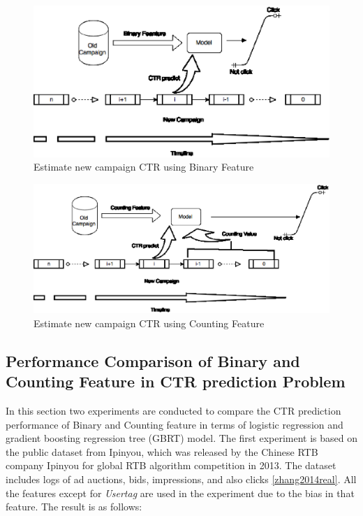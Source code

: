 \documentclass{sig-alternate}
\begin{document}
\begin{figure}[t]
\centering
\includegraphics[width=\columnwidth]{binaryrepresent.eps}
\caption{Estimate new campaign CTR using Binary Feature}
\label{fig:binary}
\end{figure}

\begin{figure}[h]
\centering
\includegraphics[width=\columnwidth]{counting.eps}
\caption{Estimate new campaign CTR using Counting Feature}
\label{fig:counting}
\end{figure}


\subsection{Performance Comparison of Binary and Counting Feature in CTR prediction Problem}

In this section two experiments are conducted to compare the CTR prediction performance of Binary and Counting feature in terms of logistic regression and gradient boosting regression tree (GBRT) model. The first experiment is based on the public dataset from Ipinyou, which was released by the Chinese RTB company Ipinyou for global RTB algorithm competition in 2013. The dataset includes logs of ad auctions, bids, impressions, and also clicks \ref{zhang2014real}. All the features except for \textit{Usertag} are used in the experiment due to the bias in that feature. The result is as follows:
\end{document}
